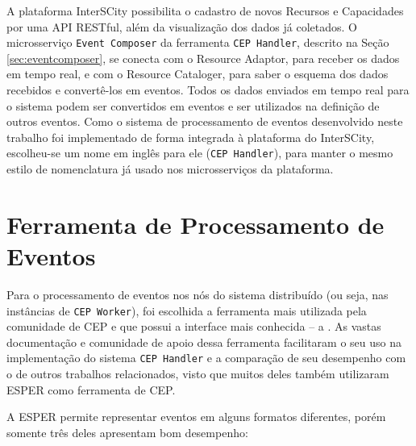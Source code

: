 A plataforma InterSCity possibilita o cadastro de novos Recursos e Capacidades por uma API RESTful, além da visualização dos dados já coletados. O microsserviço \texttt{Event Composer} da ferramenta \texttt{CEP Handler}, descrito na Seção \ref{sec:eventcomposer}, se conecta com o Resource Adaptor, para receber os dados em tempo real, e com o Resource Cataloger, para saber o esquema dos dados recebidos e convertê-los em eventos. Todos os dados enviados em tempo real para o sistema podem ser convertidos em eventos e ser utilizados na definição de outros eventos.
Como o sistema de processamento de eventos desenvolvido neste trabalho foi implementado de forma integrada à plataforma do InterSCity, escolheu-se um nome em inglês para ele (\texttt{CEP Handler}), para manter o mesmo estilo de nomenclatura já usado nos microsserviços da plataforma.  


\section{Ferramenta de Processamento de Eventos}
Para o processamento de eventos nos nós do sistema distribuído (ou seja, nas instâncias de \texttt{CEP Worker}), foi escolhida a ferramenta mais utilizada pela comunidade de CEP e que possui a interface mais conhecida -- a \cite{ESPER}. As vastas documentação e comunidade de apoio dessa ferramenta facilitaram o seu uso na implementação do sistema \texttt{CEP Handler} e a comparação de seu desempenho com o de outros trabalhos relacionados, visto que muitos deles também utilizaram ESPER como ferramenta de CEP.


A ESPER permite representar eventos em alguns formatos diferentes, porém somente três deles apresentam bom desempenho\citep{EsperEventRepresentation}:

